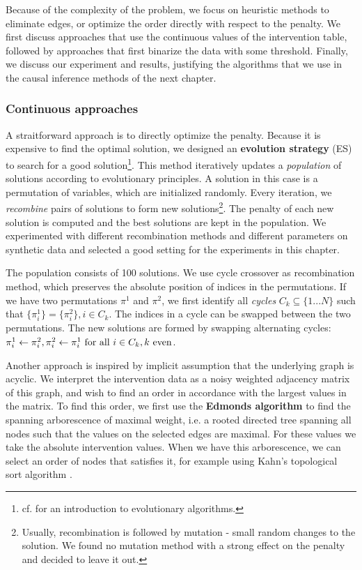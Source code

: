 Because of the complexity of the problem, we focus on heuristic methods to eliminate edges, or optimize the order directly with respect to the penalty. We first discuss approaches that use the continuous values of the intervention table, followed by approaches that first binarize the data with some threshold. Finally, we discuss our experiment and results, justifying the algorithms that we use in the causal inference methods of the next chapter.

\subsubsection{Continuous approaches}

A straitforward approach is to directly optimize the penalty. Because it is expensive to find the optimal solution, we designed an \textbf{evolution strategy} (ES) to search for a good solution\footnote{cf. \citet{eiben2003introduction} for an introduction to evolutionary algorithms.}. This method iteratively updates a \textit{population} of solutions according to evolutionary principles. A solution in this case is a permutation of variables, which are initialized randomly. Every iteration, we \textit{recombine} pairs of solutions to form new solutions\footnote{Usually, recombination is followed by mutation - small random changes to the solution. We found no mutation method with a strong effect on the penalty and decided to leave it out.}. The penalty of each new solution is computed and the best solutions are kept in the population. We experimented with different recombination methods and different parameters on synthetic data and selected a good setting for the experiments in this chapter. 

The population consists of 100 solutions. We use cycle crossover \citep{oliver1987study} as recombination method, which preserves the absolute position of indices in the permutations. If we have two permutations $\pi^1$ and $\pi^2$, we first identify all \textit{cycles} $C_k \subseteq \{1...N \}$ such that $\{\pi^1_i \} = \{\pi^2_i \}, i\in C_k$. The indices in a cycle can be swapped between the two permutations. The new solutions are formed by swapping alternating cycles: $\pi^1_i \leftarrow \pi^2_i, \pi^2_i \leftarrow \pi^1_i \text{ for all } i\in C_k, k \text{ even}$.

Another approach is inspired by implicit assumption that the underlying graph is acyclic. We interpret the intervention data as a noisy weighted adjacency matrix of this graph, and wish to find an order in accordance with the largest values in the matrix. To find this order, we first use the \textbf{Edmonds algorithm} \citep{edmonds1967optimum} to find the spanning arborescence of maximal weight, i.e. a rooted directed tree spanning all nodes such that the values on the selected edges are maximal. For these values we take the absolute intervention values. When we have this arborescence, we can select an order of nodes that satisfies it, for example using Kahn's topological sort algorithm \citep{kahn1962topological}. 


